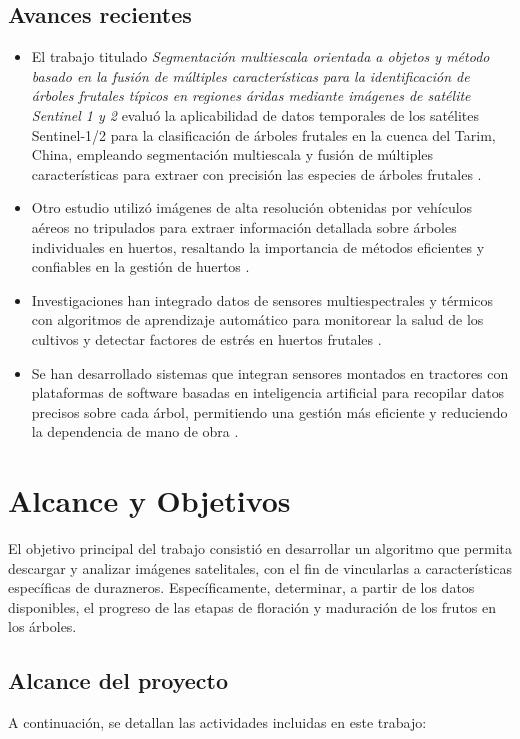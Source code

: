 \subsection{Avances recientes}

\begin{itemize}
  \item El trabajo titulado \textit{Segmentación multiescala orientada a objetos y método basado en la 
  fusión de múltiples características para la identificación de árboles frutales típicos en 
  regiones áridas mediante imágenes de satélite Sentinel 1 y 2} evaluó la aplicabilidad de datos temporales
  de los satélites Sentinel-1/2 para la clasificación de árboles frutales en la
  cuenca del Tarim, China, empleando segmentación multiescala y fusión de
  múltiples características para extraer con precisión las especies de árboles
  frutales \citep{Liang2024}.
  \item Otro estudio utilizó imágenes de alta resolución obtenidas por 
  vehículos aéreos no tripulados para extraer información detallada sobre 
  árboles individuales en huertos, resaltando la importancia de métodos eficientes
  y confiables en la gestión de huertos \citep{Dong2020}.
  \item Investigaciones han integrado datos de sensores multiespectrales y 
  térmicos con algoritmos de aprendizaje automático para monitorear la salud 
  de los cultivos y detectar factores de estrés en huertos frutales \citep{Kumar}.
  \item Se han desarrollado sistemas que integran sensores montados en tractores con 
  plataformas de software basadas en inteligencia artificial para recopilar datos 
  precisos sobre cada árbol, permitiendo una gestión más eficiente y reduciendo la 
  dependencia de mano de obra \cite{OrchardRobotics2024}.
\end{itemize}


\section{Alcance y Objetivos}
El objetivo principal del trabajo consistió en desarrollar un algoritmo que permita descargar y analizar 
imágenes satelitales, con el fin de vincularlas a características específicas de durazneros. Específicamente, 
determinar, a partir de los datos disponibles, el progreso de las etapas de floración y maduración de 
los frutos en los árboles.

\subsection{Alcance del proyecto}
A continuación, se detallan las actividades incluidas en este trabajo:

